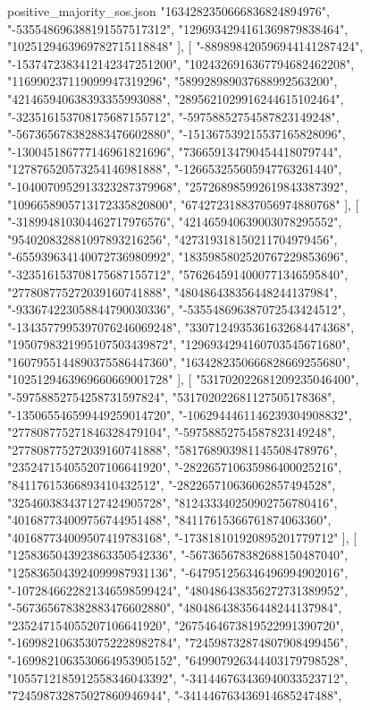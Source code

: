 \begin{filecontents*}[overwrite]{positive_majority_sos.json}
    "1634282350666836824894976",
    "-535548696388191557517312",
    "1296934294161369879838464",
    "1025129463969782715118848"
   ],
   [
    "-889898420596944141287424",
    "-1537472383412142347251200",
    "1024326916367794682462208",
    "116990237119099947319296",
    "589928989037688992563200",
    "421465940638393355993088",
    "2895621029916244615102464",
    "-323516153708175687155712",
    "-59758852754587823149248",
    "-567365678382883476602880",
    "-151367539215537165828096",
    "-130045186777146961821696",
    "736659134790454418079744",
    "127876520573254146981888",
    "-126653255605947763261440",
    "-1040070952913323287379968",
    "257268985992619843387392",
    "1096658905713172335820800",
    "674272318837056974880768"
   ],
   [
    "-318994810304462717976576",
    "421465940639003078295552",
    "954020832881097893216256",
    "427319318150211704979456",
    "-655939634140072736980992",
    "1835985802520767229853696",
    "-323516153708175687155712",
    "5762645914000771346595840",
    "277808775272039160741888",
    "480486438356448244137984",
    "-933674223058844790030336",
    "-535548696387072543424512",
    "-1343577995397076246069248",
    "3307124935361632684474368",
    "1950798321995107503439872",
    "1296934294160703545671680",
    "1607955144890375586447360",
    "1634282350666828669255680",
    "1025129463969660669001728"
   ],
   [
    "531702022681209235046400",
    "-59758852754258731597824",
    "531702022681127505178368",
    "-135065546599449259014720",
    "-1062944461146239304908832",
    "277808775271846328479104",
    "-59758852754587823149248",
    "277808775272039160741888",
    "581768903981145508478976",
    "235247154055207106641920",
    "-282265710635986400025216",
    "84117615366893410432512",
    "-282265710636062857494528",
    "325460383437127424905728",
    "812433340250902756780416",
    "401687734009756744951488",
    "84117615366761874063360",
    "401687734009507419783168",
    "-173818101920895201779712"
   ],
   [
    "1258365043923863350542336",
    "-567365678382688150487040",
    "1258365043924099987931136",
    "-647951256346496994902016",
    "-1072846622821346598599424",
    "480486438356272731389952",
    "-567365678382883476602880",
    "480486438356448244137984",
    "235247154055207106641920",
    "2675464673819522991390720",
    "-1699821063530752228982784",
    "724598732874807908499456",
    "-1699821063530664953905152",
    "649907926344403179798528",
    "1055712185912558346043392",
    "-341446763436940033523712",
    "724598732875027860946944",
    "-341446763436914685247488",

\end{filecontents*}
